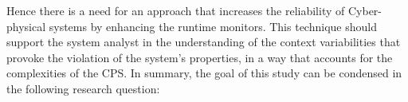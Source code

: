 Hence there is a need for an approach that increases the reliability of Cyber-physical systems by enhancing the runtime monitors. This technique should support the system analyst in the understanding of the context variabilities that provoke the violation of the system's properties, in a way that accounts for the complexities of the CPS. In summary, the goal of this study can be condensed in the following research question:

\vspace{0.5 cm}

\noindent{}
\vspace{0.3 cm}





